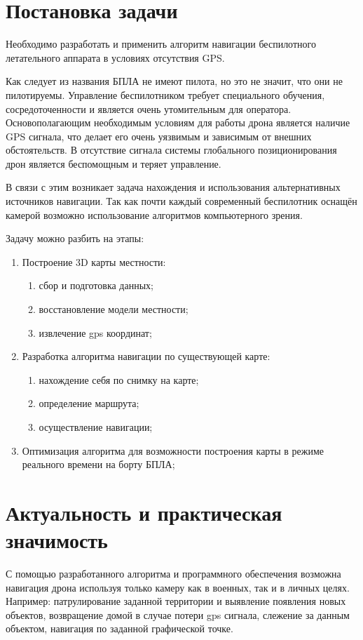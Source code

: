 \section{Постановка задачи}

Необходимо разработать и применить алгоритм навигации беспилотного летательного аппарата в условиях отсутствия GPS.

Как следует из названия БПЛА не имеют пилота, но это не значит, что они не пилотируемы. Управление беспилотником требует специального обучения, сосредоточенности и является очень утомительным для оператора. Основополагающим необходимым условиям для работы дрона является наличие GPS сигнала, что делает его очень уязвимым и зависимым от внешних обстоятельств. В отсутствие сигнала системы глобального позиционирования дрон является беспомощным и теряет управление.

В связи с этим возникает задача нахождения и использования альтернативных источников навигации. Так как почти каждый современный беспилотник оснащён камерой возможно использование алгоритмов компьютерного зрения.
 
Задачу можно разбить на этапы:
\begin{enumerate}
    \item Построение 3D карты местности:
        \begin{enumerate}
            \item сбор и подготовка данных;
            \item восстановление модели местности;
            \item извлечение gps координат;
         \end{enumerate}
    \item Разработка алгоритма навигации по существующей карте:
         \begin{enumerate}
            \item нахождение себя по снимку на карте;
            \item определение маршрута;
            \item осуществление навигации;
         \end{enumerate}
    \item Оптимизация алгоритма для возможности построения карты в режиме реального времени на борту БПЛА;
\end{enumerate}

\section{Актуальность и практическая значимость}

С помощью разработанного алгоритма и программного обеспечения возможна навигация дрона используя только камеру как в военных, так и в личных целях. Например: патрулирование заданной территории и выявление появления новых объектов, возвращение домой в случае потери gps сигнала, слежение за данным объектом, навигация по заданной графической точке.
\newpage
